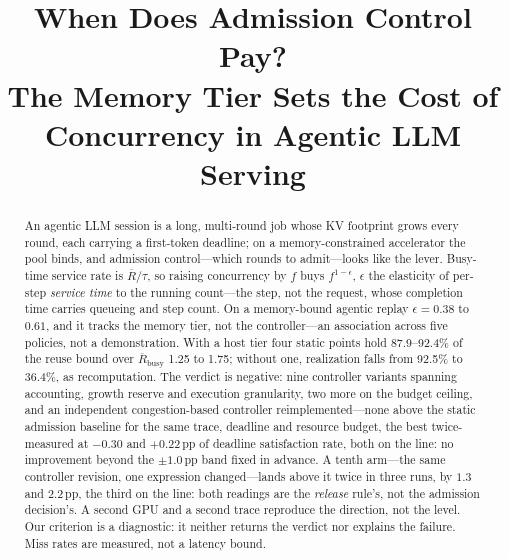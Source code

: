 \documentclass[10pt,conference]{IEEEtran}
\begin{document}
\title{When Does Admission Control Pay?\\
The Memory Tier Sets the Cost of Concurrency in Agentic LLM Serving}

\author{}

\maketitle

\begin{abstract}
An agentic LLM session is a long, multi-round job whose KV footprint grows every
round, each carrying a first-token deadline; on a memory-constrained
accelerator the pool binds, and admission control---which rounds to admit---looks
like the lever. Busy-time service rate is $\overline{R}/\tau$, so raising
concurrency by $f$ buys $f^{1-\epsilon}$, $\epsilon$ the elasticity of per-step
\emph{service time} to the running count---the step, not the request, whose
completion time carries queueing and step count. On a memory-bound
agentic replay $\epsilon = 0.38$ to $0.61$, and it tracks the memory tier, not the
controller---an association across five policies, not a
demonstration. With a host tier four static points hold 87.9--92.4\% of the reuse
bound over $\overline{R}_{\text{busy}}$ 1.25 to 1.75; without one, realization
falls from 92.5\% to 36.4\%, as recomputation. The verdict is negative: nine
controller variants spanning accounting, growth reserve and execution
granularity, two more on the budget ceiling, and an independent congestion-based
controller reimplemented---none above the static admission baseline for the same
trace, deadline and resource budget, the best twice-measured at $-0.30$ and
$+0.22$\,pp of deadline satisfaction rate, both on the line: no
improvement beyond the $\pm1.0$\,pp band fixed in advance. A tenth arm---the same
controller revision, one expression
changed---lands above it twice in three runs, by $1.3$ and $2.2$\,pp, the third on
the line: both readings are the \emph{release} rule's, not the admission decision's. A second GPU and a second trace reproduce the direction, not the level. Our criterion is a
diagnostic: it neither returns the verdict nor explains the failure. Miss rates
are measured, not a latency bound.
\end{abstract}
\end{document}
